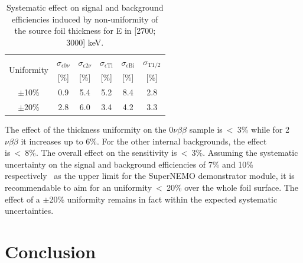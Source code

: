 \documentclass[main.tex]{subfiles}
\begin{document}
\begin{table}[h!]
\centering
\begin{tabular}{c|c|c|c|c|c}
\toprule
\multirow{2}{*}{Uniformity} & $\sigma_{\epsilon \text{0}\nu}$ & $\sigma_{\epsilon \text{2}\nu}$ & $\sigma_{\epsilon \text{Tl}}$ & $\sigma_{\epsilon \text{Bi}}$ & $\sigma_{\text{T1/2}}$ \\
  & [\%]  & [\%]  & [\%]  & [\%]  & [\%]  \\[0.1cm]
\hline 
$\pm$10\% & 0.9 & 5.4 & 5.2 & 8.4 & 2.8 \\[0.1cm]
\hline 
$\pm$20\% & 2.8 & 6.0 & 3.4 & 4.2 & 3.3 \\[0.1cm]
\bottomrule
\end{tabular}
\caption{Systematic effect on signal and background efficiencies induced by non-uniformity of the source foil thickness for E  in [2700; 3000] keV.}
\label{Tab:SystematicInfluence}
\end{table}


\NI  The effect of the thickness uniformity on the 0$\nu\beta\beta$ sample is~<~3\% while for 2$\nu\beta\beta$ it increases up to 6\%. For the other internal backgrounds, the effect is~<~8\%. The overall effect on the sensitivity is~<~3\%. Assuming the systematic uncertainty on the signal and background efficiencies of 7\% and 10\% respectively~\cite{NEMO3:Mo100} as the upper limit for the SuperNEMO demonstrator module, it is recommendable to aim for an uniformity~<~20\% over the whole foil surface. The effect of a $\pm$20\% uniformity remains in fact within the expected systematic uncertainties. %


\FloatBarrier


\section{Conclusion}\label{sec:SourceFoilDesignConclusion}
\end{document}
